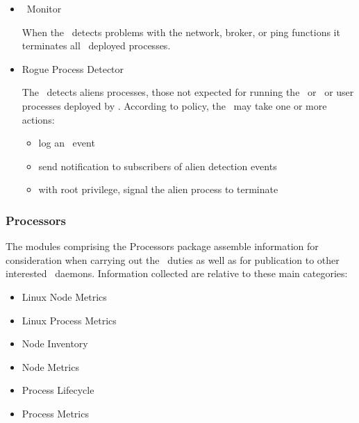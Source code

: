     \begin{itemize}
      \item \varAgent~Monitor
      
      When the \varAgent~detects problems with the network, broker, or ping
      functions it terminates all \varAgent~deployed processes.
       
      \item Rogue Process Detector
      
      The \varAgent~detects aliens processes, those not expected for running
      the \varOS~or \varDUCC~or user processes deployed by \varDUCC.
      According to policy, the \varAgent~may take one or more actions:
      \begin{itemize}
        \item log an \varAlienDetected~event
        \item send notification to subscribers of alien detection events
        \item with root privilege, signal the alien process to terminate
      \end{itemize} 
      
    \end{itemize}   
    
    \subsubsection{Processors} 
    
    The modules comprising the Processors package assemble information for
    consideration when carrying out the \varAgent~duties as well as for publication
    to other interested \varDUCC~daemons.  Information collected are relative to
    these main categories:
    
    \begin{itemize}
      \item Linux Node Metrics
      \item Linux Process Metrics
      \item Node Inventory
      \item Node Metrics
      \item Process Lifecycle
      \item Process Metrics
    \end{itemize}   
    